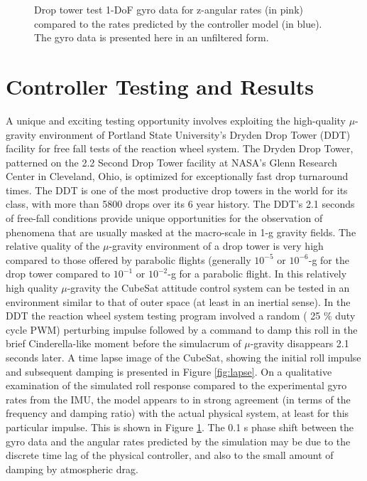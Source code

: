 \documentclass[]{aiaa-tc}%
\begin{document}
\begin{figure}[!ht]
 \centering
 {\footnotesize }
 \caption{Drop tower test 1-DoF gyro data for z-angular rates (in pink) compared to the rates predicted by the controller model (in blue). The gyro data is presented here in an unfiltered form.}
 \label{fig:drop_results}
\end{figure}

\section{Controller Testing and Results}
A unique and exciting testing opportunity involves exploiting the high-quality $\mu$-gravity environment of Portland State University's Dryden Drop Tower (DDT) facility for free fall tests of the reaction wheel system. The Dryden Drop Tower, patterned on the 2.2 Second Drop Tower facility at NASA's Glenn Research Center in Cleveland, Ohio, is optimized for exceptionally fast drop turnaround times. The DDT is one of the most productive drop towers in the world for its class, with more than 5800 drops over its 6 year history. 
The DDT's 2.1 seconds of free-fall conditions provide unique opportunities for the observation of phenomena that are usually masked at the macro-scale in 1-g gravity fields. The relative quality of the $\mu$-gravity environment of a drop tower is very high compared to those offered by parabolic flights (generally $10^{-5}$ or $10^{-6}$-g for the drop tower compared to $10^{-1}$ or $10^{-2}$-g for a parabolic flight. In this relatively high quality $\mu$-gravity the CubeSat attitude control system can be tested in an environment similar to that of outer space (at least in an inertial sense). In the DDT the reaction wheel system testing program involved a random ( 25 \% duty cycle PWM) perturbing impulse followed by a command to damp this roll in the brief Cinderella-like moment before the simulacrum of $\mu$-gravity disappears 2.1 seconds later. A time lapse image of the CubeSat, showing the initial roll impulse and subsequent damping is presented in Figure \ref{fig:lapse}. On a qualitative examination of the simulated roll response compared to the experimental gyro rates from the IMU, the model appears to in strong agreement (in terms of the frequency and damping ratio) with the actual physical system, at least for this particular impulse. This is shown in Figure \ref{fig:drop_results}. The 0.1 s phase shift between the gyro data and the angular rates predicted by the simulation may be due to the discrete time lag of the physical controller, and also to the small amount of damping by atmospheric drag.  
\end{document}
